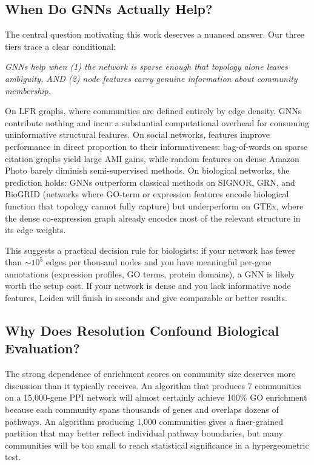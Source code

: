 \documentclass[11pt]{article}
\begin{document}
\subsection{When Do GNNs Actually Help?}

The central question motivating this work deserves a nuanced answer.
Our three tiers trace a clear conditional:

\emph{GNNs help when (1) the network is sparse enough that topology alone leaves ambiguity, AND (2) node features carry genuine information about community membership.}

On LFR graphs, where communities are defined entirely by edge density, GNNs contribute nothing and incur a substantial computational overhead for consuming uninformative structural features.
On social networks, features improve performance in direct proportion to their informativeness: bag-of-words on sparse citation graphs yield large AMI gains, while random features on dense Amazon Photo barely diminish semi-supervised methods.
On biological networks, the prediction holds: GNNs outperform classical methods on SIGNOR, GRN, and BioGRID (networks where GO-term or expression features encode biological function that topology cannot fully capture) but underperform on GTEx, where the dense co-expression graph already encodes most of the relevant structure in its edge weights.

This suggests a practical decision rule for biologists: if your network has fewer than ${\sim}10^5$ edges per thousand nodes and you have meaningful per-gene annotations (expression profiles, GO terms, protein domains), a GNN is likely worth the setup cost.
If your network is dense and you lack informative node features, Leiden will finish in seconds and give comparable or better results.

\subsection{Why Does Resolution Confound Biological Evaluation?}

The strong dependence of enrichment scores on community size deserves more discussion than it typically receives.
An algorithm that produces 7 communities on a 15{,}000-gene PPI network will almost certainly achieve 100\% GO enrichment because each community spans thousands of genes and overlaps dozens of pathways.
An algorithm producing 1{,}000 communities gives a finer-grained partition that may better reflect individual pathway boundaries, but many communities will be too small to reach statistical significance in a hypergeometric test.
\end{document}
